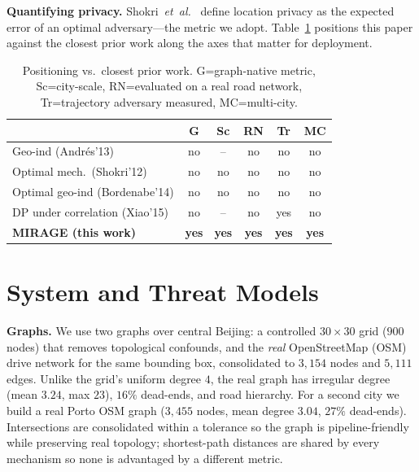 \documentclass[10pt,journal,compsoc]{IEEEtran}
\begin{document}
\textbf{Quantifying privacy.} Shokri~\emph{et~al.}~\cite{shokri2011} define
location privacy as the expected error of an optimal adversary---the metric we
adopt. Table~\ref{tab:related} positions this paper against the closest prior
work along the axes that matter for deployment.

\begin{table}[t]\centering
\caption{Positioning vs.\ closest prior work. G=graph-native metric,
Sc=city-scale, RN=evaluated on a real road network, Tr=trajectory adversary
measured, MC=multi-city.}
\label{tab:related}
\begin{tabular}{lccccc}
\toprule
 & G & Sc & RN & Tr & MC \\
\midrule
Geo-ind (Andr\'{e}s'13) \cite{andres2013}          & no  & --  & no  & no  & no \\
Optimal mech.\ (Shokri'12) \cite{shokri2012}        & no  & no  & no  & no  & no \\
Optimal geo-ind (Bordenabe'14) \cite{bordenabe2014} & no  & no  & no  & no  & no \\
DP under correlation (Xiao'15) \cite{xiao2015}       & no  & --  & no  & yes & no \\
\textbf{MIRAGE (this work)}                          & \textbf{yes} & \textbf{yes} & \textbf{yes} & \textbf{yes} & \textbf{yes} \\
\bottomrule
\end{tabular}
\end{table}

\section{System and Threat Models}
\label{sec:sysmodel}
\textbf{Graphs.} We use two graphs over central Beijing: a controlled
$30\times30$ grid ($900$ nodes) that removes topological confounds, and the
\emph{real} OpenStreetMap (OSM) drive network for the same bounding box,
consolidated to $3{,}154$ nodes and $5{,}111$ edges. Unlike the grid's uniform
degree $4$, the real graph has irregular degree (mean $3.24$, max $23$), $16\%$
dead-ends, and road hierarchy. For a second city we build a real Porto OSM graph
($3{,}455$ nodes, mean degree $3.04$, $27\%$ dead-ends). Intersections are
consolidated within a tolerance so the graph is pipeline-friendly while
preserving real topology; shortest-path distances are shared by every mechanism
so none is advantaged by a different metric.
\end{document}
